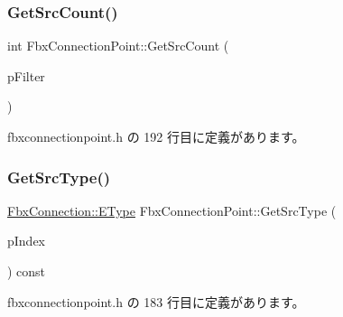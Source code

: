 \subsubsection{\texorpdfstring{Get\+Src\+Count()}{GetSrcCount()}\hspace{0.1cm}{\footnotesize\ttfamily [2/2]}}
{\footnotesize\ttfamily int Fbx\+Connection\+Point\+::\+Get\+Src\+Count (\begin{DoxyParamCaption}\item[{\hyperlink{class_fbx_connection_point_filter}{Fbx\+Connection\+Point\+Filter} $\ast$}]{p\+Filter }\end{DoxyParamCaption})\hspace{0.3cm}{\ttfamily [inline]}}



 fbxconnectionpoint.\+h の 192 行目に定義があります。

\mbox{\label{class_fbx_connection_point_ab7147b771ece407b567b68743e53d96f}} 
\subsubsection{\texorpdfstring{Get\+Src\+Type()}{GetSrcType()}\hspace{0.1cm}{\footnotesize\ttfamily [1/2]}}
{\footnotesize\ttfamily \hyperlink{class_fbx_connection_a3df448a5db356652ab99fd2be2553749}{Fbx\+Connection\+::\+E\+Type} Fbx\+Connection\+Point\+::\+Get\+Src\+Type (\begin{DoxyParamCaption}\item[{int}]{p\+Index }\end{DoxyParamCaption}) const\hspace{0.3cm}{\ttfamily [inline]}}



 fbxconnectionpoint.\+h の 183 行目に定義があります。

\mbox{\label{class_fbx_connection_point_a9eea3bf9fe36a61533e575b730ce7a47}} 
